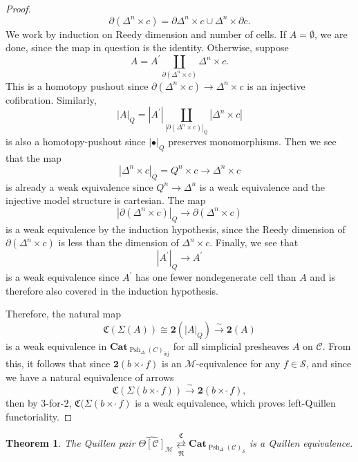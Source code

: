 \documentclass{amsart}
\numberwithin{equation}{section}
\theoremstyle{plain}   %
\newtheorem{thm}[subsection]{Theorem}
\theoremstyle{remark}
\theoremstyle{plain}
\DeclareMathOperator{\Psh}{Psh}
\newcommand{\Cat}{\ensuremath{\mathbf{Cat}}}
\newcommand{\realiz}[1]{\ensuremath{\left\lvert#1\right\rvert}}
\newcommand{\C}{\ensuremath{\mathcal{C}}}
\newcommand{\M}{\ensuremath{\mathcal{M}}}
\newcommand{\setS}{\ensuremath{\mathscr{S}}}
\newcommand{\cellset}{\ensuremath{\widehat{\Theta[\mathcal{C}]}}}
\begin{document}
\begin{proof}
  \[\partial(\Delta^n\times c)=\partial\Delta^n \times c \cup \Delta^n \times \partial c.\]
  We work by induction on Reedy dimension and number of cells.
  If \(A=\emptyset\), we are done, since the map in question is the identity.
  Otherwise, suppose
  \[A=A^\prime \coprod_{\partial(\Delta^n\times c)}  \Delta^n\times c.\]
  This is a homotopy pushout since \(\partial(\Delta^n \times c) \to \Delta^n\times c\) is an injective cofibration. Similarly, 
  \[\realiz{A}_Q=\realiz{A^\prime} \coprod_{\realiz{\partial(\Delta^n\times c)}_Q}  \realiz{\Delta^n\times c}\]
  is also a homotopy-pushout since \(\realiz{\bullet}_Q\) preserves monomorphisms.  Then we see that the map 
  \[\realiz{\Delta^n \times c}_Q=Q^n \times c \to \Delta^n\times c\] is already a weak equivalence since \(Q^n\to \Delta^n\) is a weak equivalence and the injective model structure is cartesian.  The map 
  \[\realiz{\partial(\Delta^n \times c)}_Q \to \partial(\Delta^n \times c)\]
  is a weak equivalence by the induction hypothesis, since the Reedy dimension of \(\partial(\Delta^n \times c)\) is less than the dimension of \(\Delta^n \times c\). Finally, we see that 
  \[\realiz{A^\prime}_Q \to A^\prime\]
  is a weak equivalence since \(A^\prime\) has one fewer nondegenerate cell than \(A\) and is therefore also covered in the induction hypothesis.

  Therefore, the natural map
  \[\mathfrak{C}(\Sigma(A))\cong \mathbf{2}(\realiz{A}_Q) \xrightarrow{\sim} \mathbf{2}(A)\]
  is a weak equivalence in \(\Cat_{\Psh_{\Delta}(C)_{\mathrm{inj}}}\) for all simplicial presheaves \(A\) on \(\C\).
  From this, it follows that since \(\mathbf{2}(b\times^\lrcorner f)\) is an \(\M\)-equivalence for any \(f\in \setS\), and since we have a natural equivalence of arrows \[\mathfrak{C}(\Sigma(b\times^\lrcorner f))\xrightarrow{\sim} \mathbf{2}(b\times^\lrcorner f),\] then by \(3\)-for-\(2\), \(\mathfrak{C}(\Sigma(b\times^\lrcorner f)\) is a weak equivalence, which proves left-Quillen functoriality.
\end{proof}
\begin{thm}\label{maintheorem2}
  The Quillen pair \(\cellset_\M \underset{\mathfrak{N}}{\overset{\mathfrak{C}}{\rightleftarrows}} \Cat_{\Psh_{\Delta}(\C)_{\setS}}\) is a Quillen equivalence.
\end{thm}
\end{document}
